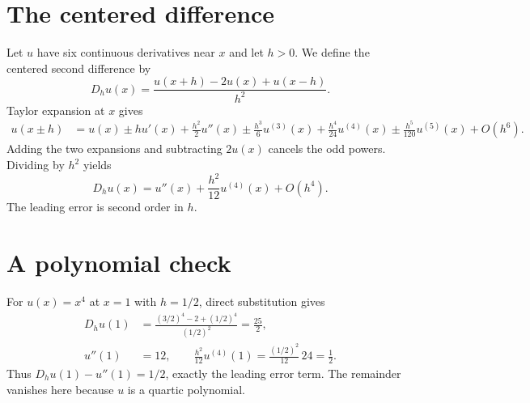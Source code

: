 \section{The centered difference}
Let $u$ have six continuous derivatives near $x$ and let $h>0$.
We define the centered second difference by
\begin{equation}\label{eq:stencil}
 D_h u(x)=\frac{u(x+h)-2u(x)+u(x-h)}{h^2}.
\end{equation}
Taylor expansion at $x$ gives
\begin{align*}
 u(x\mathbin{\pm}h)
 &=u(x)\mathbin{\pm}hu'(x)+\frac{h^2}{2}u''(x)
   \mathbin{\pm}\frac{h^3}{6}u^{(3)}(x)
   +\frac{h^4}{24}u^{(4)}(x)
   \mathbin{\pm}\frac{h^5}{120}u^{(5)}(x)+O(h^6).
\end{align*}
Adding the two expansions and subtracting $2u(x)$ cancels the odd
powers. Dividing by $h^2$ yields
\begin{equation}\label{eq:error}
 D_h u(x)=u''(x)+\frac{h^2}{12}u^{(4)}(x)+O(h^4).
\end{equation}
The leading error is second order in $h$.

\section{A polynomial check}
For $u(x)=x^4$ at $x=1$ with $h=1/2$, direct substitution gives
\begin{align*}
 D_hu(1)&=\frac{(3/2)^4-2+(1/2)^4}{(1/2)^2}=\frac{25}{2},\\
 u''(1)&=12,\qquad
 \frac{h^2}{12}u^{(4)}(1)=\frac{(1/2)^2}{12}\,24=\frac{1}{2}.
\end{align*}
Thus $D_hu(1)-u''(1)=1/2$, exactly the leading error term.
The remainder vanishes here because $u$ is a quartic polynomial.
